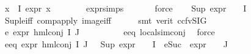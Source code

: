\begin{isabellebody}
\ {\isachardoublequoteopen}{\isasymforall}x{\isasymin}{\isasymPhi}\ {\isacharbackquote}{\kern0pt}\ I{\isachardot}{\kern0pt}\ expr{\isacharunderscore}{\kern0pt}{}\ x\ {\isasymle}\ {}{\isachardoublequoteclose}\isanewline
\ \ \ \ \isamarkupfalse%
\ expr{\isachardot}{\kern0pt}simps\ \isanewline
\ \ \ \ \isamarkupfalse%
\ force\isanewline
\ \ \isamarkupfalse%
\ {\isachardoublequoteopen}Sup\ {\isacharparenleft}{\kern0pt}{\isacharparenleft}{\kern0pt}expr{\isacharunderscore}{\kern0pt}{}\ {\isasymcirc}\ {\isasymPhi}{\isacharparenright}{\kern0pt}\ {\isacharbackquote}{\kern0pt}\ I{\isacharparenright}{\kern0pt}\ {\isasymle}\ {}{\isachardoublequoteclose}\isanewline
\ \ \ \ \isamarkupfalse%
\ Sup{\isacharunderscore}{\kern0pt}le{\isacharunderscore}{\kern0pt}iff\ comp{\isacharunderscore}{\kern0pt}apply\ image{\isacharunderscore}{\kern0pt}iff\isanewline
\ \ \ \ \isamarkupfalse%
\ {\isacharparenleft}{\kern0pt}smt\ {\isacharparenleft}{\kern0pt}verit{\isacharcomma}{\kern0pt}\ ccfv{\isacharunderscore}{\kern0pt}SIG{\isacharparenright}{\kern0pt}{\isacharparenright}{\kern0pt}\isanewline
\ \ \isamarkupfalse%
\ e{}{\isacharcolon}{\kern0pt}\ {\isachardoublequoteopen}expr{\isacharunderscore}{\kern0pt}{}\ {\isacharparenleft}{\kern0pt}hml{\isacharunderscore}{\kern0pt}conj\ I\ J\ {\isasymPhi}{\isacharparenright}{\kern0pt}\ {\isasymle}\ {}{\isachardoublequoteclose}\ \isanewline
\ \ \ \ \isamarkupfalse%
\ e{}{\isacharunderscore}{\kern0pt}eq\ local{\isachardot}{\kern0pt}sim{\isacharunderscore}{\kern0pt}conj\ \isamarkupfalse%
\ force\isanewline
\isanewline
\ \ \isamarkupfalse%
\ e{}{\isacharunderscore}{\kern0pt}eq{\isacharcolon}{\kern0pt}\ {\isachardoublequoteopen}expr{\isacharunderscore}{\kern0pt}{}\ {\isacharparenleft}{\kern0pt}hml{\isacharunderscore}{\kern0pt}conj\ I\ J\ {\isasymPhi}{\isacharparenright}{\kern0pt}\ {\isacharequal}{\kern0pt}\ {\isacharparenleft}{\kern0pt}Sup\ {\isacharparenleft}{\kern0pt}{\isacharparenleft}{\kern0pt}expr{\isacharunderscore}{\kern0pt}{}\ {\isasymcirc}\ {\isasymPhi}{\isacharparenright}{\kern0pt}\ {\isacharbackquote}{\kern0pt}\ I\ {\isasymunion}\ {\isacharparenleft}{\kern0pt}{\isacharparenleft}{\kern0pt}eSuc\ {\isasymcirc}\ expr{\isacharunderscore}{\kern0pt}{}\ {\isasymcirc}\ {\isasymPhi}{\isacharparenright}{\kern0pt}\ {\isacharbackquote}{\kern0pt}\ J{\isacharparenright}{\kern0pt}{\isacharparenright}{\kern0pt}{\isacharparenright}{\kern0pt}{\isachardoublequoteclose}\isanewline

\end{isabellebody}
